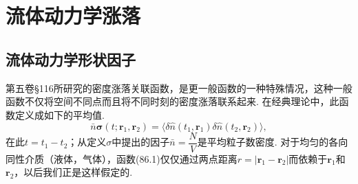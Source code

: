 %
%

\chapter{流体动力学涨落}

\setcounter{section}{85}

\section{流体动力学形状因子}


第五卷§116所研究的密度涨落关联函数，是更一般函数的一种特殊情况，这种一般函数不仅将空间不同点而且将不同时刻的密度涨落联系起来. 在经典理论中，此函数定义成如下的平均值.
\begin{equation}
\bar{n}\bm{\sigma}(t;\bm{r}_{1},\bm{r}_{2})=\langle\delta\hat{n}(t_{1},\bm{r}_{1})\delta\hat{n}(t_{2},\bm{r}_{2})\rangle,
\end{equation}
在此$t=t_{1}-t_{2}$；从定义$\sigma$中提出的因子$\bar{n}=\dfrac{N}{V}$是平均粒子数密度. 对于均匀的各向同性介质（液体，气体），函数(86.1)仅仅通过两点距离$r=|\bm{r}_{1}-\bm{r}_{2}|$而依赖于$\bm{r}_{1}$和$\bm{r}_{2}$，以后我们正是这样假定的.

